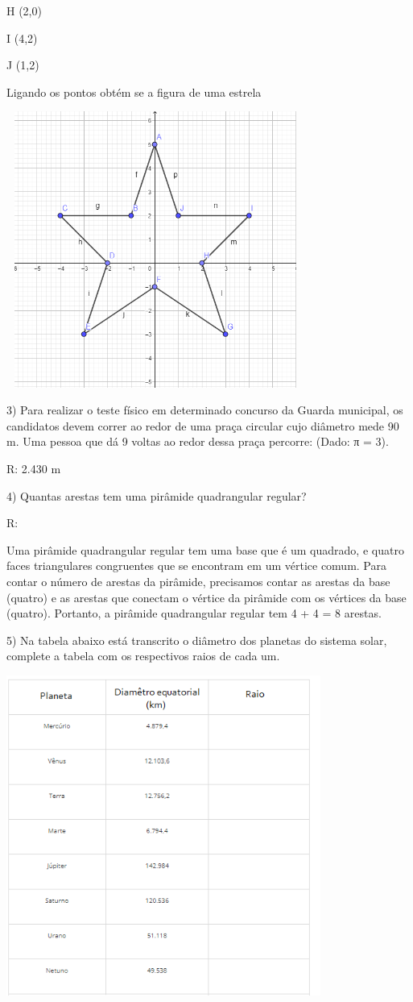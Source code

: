 H (2,0)

I (4,2)

J (1,2)

Ligando os pontos obtém se a figura de uma estrela

\includegraphics[width=3.85417in,height=3.56597in]{./imgSAEB_6_MAT/media/image45.png}

3) Para realizar o teste físico em determinado concurso da Guarda
municipal, os candidatos devem correr ao redor de uma praça circular
cujo diâmetro mede 90 m. Uma pessoa que dá 9 voltas ao redor dessa praça
percorre: (Dado: π = 3).

R: 2.430 m

4) Quantas arestas tem uma pirâmide quadrangular regular?

R:

Uma pirâmide quadrangular regular tem uma base que é um quadrado, e
quatro faces triangulares congruentes que se encontram em um vértice
comum. Para contar o número de arestas da pirâmide, precisamos contar as
arestas da base (quatro) e as arestas que conectam o vértice da pirâmide
com os vértices da base (quatro). Portanto, a pirâmide quadrangular
regular tem 4 + 4 = 8 arestas.

5) Na tabela abaixo está transcrito o diâmetro dos planetas do sistema
solar, complete a tabela com os respectivos raios de cada um.

\includegraphics[width=4.05833in,height=4.13212in]{./imgSAEB_6_MAT/media/image48.png}


